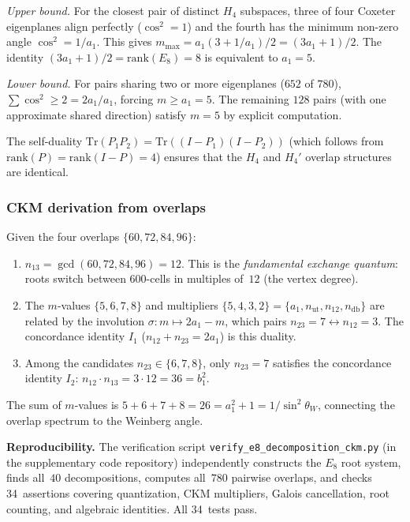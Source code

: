 \documentclass[12pt,a4paper]{article}
\theoremstyle{definition}
\begin{document}
\emph{Upper bound.}  For the closest pair of distinct $H_4$ subspaces, three of four Coxeter eigenplanes align perfectly ($\cos^2 = 1$) and the fourth has the minimum non-zero angle $\cos^2 = 1/a_1$.  This gives $m_{\max} = a_1(3 + 1/a_1)/2 = (3a_1 + 1)/2$.  The identity $(3a_1+1)/2 = \mathrm{rank}(E_8) = 8$ is equivalent to $a_1 = 5$.

\emph{Lower bound.}  For pairs sharing two or more eigenplanes ($652$ of $780$), $\sum\cos^2 \geq 2 = 2a_1/a_1$, forcing $m \geq a_1 = 5$.  The remaining $128$ pairs (with one approximate shared direction) satisfy $m = 5$ by explicit computation.

The self-duality $\mathrm{Tr}(P_1 P_2) = \mathrm{Tr}((I-P_1)(I-P_2))$ (which follows from $\mathrm{rank}(P) = \mathrm{rank}(I-P) = 4$) ensures that the $H_4$ and $H_4'$ overlap structures are identical.

\subsubsection{CKM derivation from overlaps}

Given the four overlaps $\{60, 72, 84, 96\}$:
\begin{enumerate}
\item $n_{13} = \gcd(60, 72, 84, 96) = 12$.  This is the \emph{fundamental exchange quantum}: roots switch between 600-cells in multiples of~$12$ (the vertex degree).
\item The $m$-values $\{5, 6, 7, 8\}$ and multipliers $\{5, 4, 3, 2\} = \{a_1, n_{\text{ut}}, n_{12}, n_{\text{db}}\}$ are related by the involution $\sigma\colon m \mapsto 2a_1 - m$, which pairs $n_{23} = 7 \leftrightarrow n_{12} = 3$.  The concordance identity $I_1$ ($n_{12} + n_{23} = 2a_1$) is this duality.
\item Among the candidates $n_{23} \in \{6, 7, 8\}$, only $n_{23} = 7$ satisfies the concordance identity $I_2$: $n_{12} \cdot n_{13} = 3 \cdot 12 = 36 = b_1^2$.
\end{enumerate}
The sum of $m$-values is $5+6+7+8 = 26 = a_1^2 + 1 = 1/\sin^2\theta_W$, connecting the overlap spectrum to the Weinberg angle.

\textbf{Reproducibility.}  The verification script \texttt{verify\_e8\_decomposition\_ckm.py} (in the supplementary code repository) independently constructs the $E_8$ root system, finds all~$40$ decompositions, computes all~$780$ pairwise overlaps, and checks 34~assertions covering quantization, CKM multipliers, Galois cancellation, root counting, and algebraic identities.  All 34~tests pass.
\end{document}
